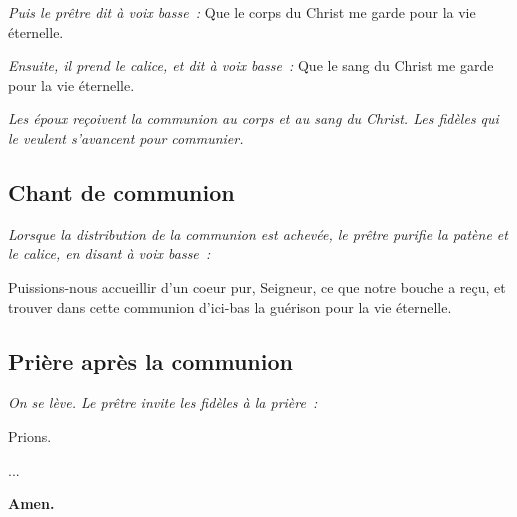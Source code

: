 \emph{Puis le prêtre dit à voix basse~:}
Que le corps du Christ me garde pour la vie éternelle.

\emph{Ensuite, il prend le calice, et dit à voix basse~:}
Que le sang du Christ me garde pour la vie éternelle.


\emph{Les époux reçoivent la communion au corps et au sang du                   
Christ. Les fidèles qui le veulent s'avancent pour communier.}

\subsection*{Chant de communion}

\emph{Lorsque la distribution de la communion est achevée, le prêtre            
purifie la patène et le calice, en disant à voix basse~:}

Puissions-nous accueillir d'un coeur pur, Seigneur, ce que notre
bouche a reçu, et trouver dans cette communion d'ici-bas la guérison
pour la vie éternelle.

\subsection*{Prière après la communion}

\emph{On se lève. Le prêtre invite les fidèles à la prière~:}

Prions.

...

{\bf Amen.}
